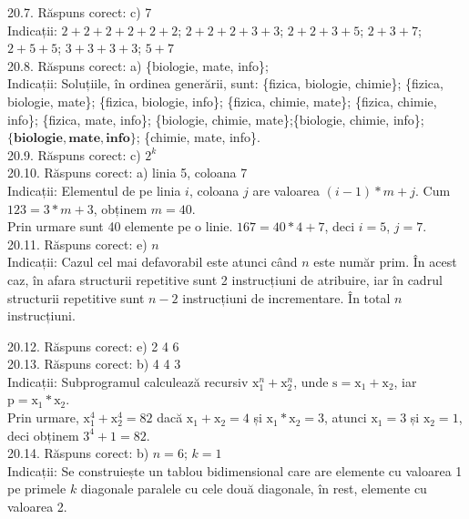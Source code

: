 20.7. Răspuns corect: c) 7\\
Indicații: $2+2+2+2+2+2$; $2+2+2+3+3$; $2+2+3+5$; $2+3+7$; $2+5+5$; $3+3+3+3$; $5+7$\\

20.8. Răspuns corect: a) \{biologie, mate, info\};\\
Indicații: Soluțiile, în ordinea generării, sunt: \{fizica, biologie, chimie\}; \{fizica, biologie, mate\}; \{fizica, biologie, info\}; \{fizica, chimie, mate\}; \{fizica, chimie, info\}; \{fizica, mate, info\}; \{biologie, chimie, mate\};\{biologie, chimie, info\}; $\mathbf{\{biologie, mate, info\}}$; \{chimie, mate, info\}.\\

20.9. Răspuns corect: c) $2^{k}$\\

20.10. Răspuns corect: a) linia 5, coloana 7\\
Indicații: Elementul de pe linia $i$, coloana $j$ are valoarea $(i-1)*m+j$. Cum $123=3*m+3$, obținem $m=40$.\\ Prin urmare sunt 40 elemente pe o linie. $167=40 * 4+7$, deci $i=5$, $j=7$.\\

20.11. Răspuns corect: e) $n$\\
Indicații: Cazul cel mai defavorabil este atunci când $n$ este număr prim. În acest caz, în afara structurii repetitive sunt 2 instrucțiuni de atribuire, iar în cadrul structurii repetitive sunt $n-2$ instrucțiuni de incrementare. În total $n$ instrucțiuni.

20.12. Răspuns corect: e) 2 4 6\\

20.13. Răspuns corect: b) 4 4 3\\
Indicații: Subprogramul calculează recursiv $\mathrm{x}_{1}^{n}+\mathrm{x}_{2}^{n}$, unde $\mathrm{s}=\mathrm{x}_{1}+\mathrm{x}_{2}$, iar $\mathrm{p}=\mathrm{x}_{1} * \mathrm{x}_{2}$.\\ Prin urmare, $\mathrm{x}_{1}^{4}+\mathrm{x}_{2}^{4}=82$ dacă $\mathrm{x}_{1}+\mathrm{x}_{2}=4$ și $\mathrm{x}_{1} * \mathrm{x}_{2}=3$, atunci $\mathrm{x}_{1}=3$ și $\mathrm{x}_{2}=1$, deci obținem $3^{4}+1=82$.\\

20.14. Răspuns corect: b) $n=6$; $k=1$\\
Indicații: Se construiește un tablou bidimensional care are elemente cu valoarea 1 pe primele $k$ diagonale paralele cu cele două diagonale, în rest, elemente cu valoarea 2.\\

